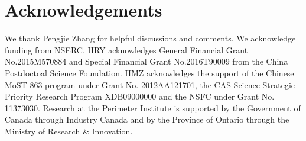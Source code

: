 \documentclass[aps,prd,twocolumn,superscriptaddress,amsfont,amssymb,amsmath,nofootinbib,showpacs,balancelastpage]{revtex4-1}
\begin{document}
\section*{Acknowledgements}
We thank Pengjie Zhang for helpful discussions and comments.
We acknowledge funding from NSERC.
HRY acknowledges General Financial Grant No.2015M570884 and Special Financial Grant No.2016T90009 from the China Postdoctoal Science Foundation.
HMZ acknowledges the support of the Chinese MoST 863 program under Grant
No. 2012AA121701, the CAS Science Strategic Priority Research Program
XDB09000000 and the NSFC under Grant No. 11373030.
Research at the Perimeter Institute is supported by the Government of Canada
through Industry Canada and by the Province of Ontario through the Ministry of
Research $\&$ Innovation.

%


\end{document}
